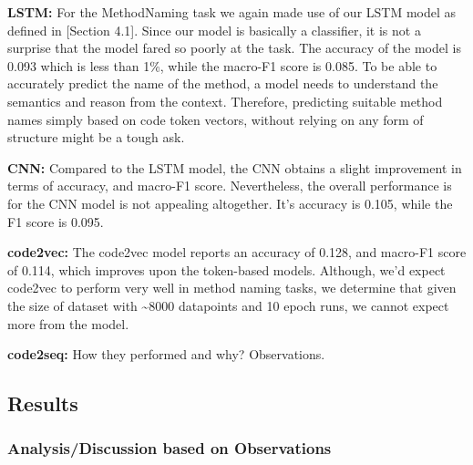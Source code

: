 \documentclass[sigplan,review,anonymous]{acmart}\settopmatter{printfolios=true,printccs=false,printacmref=false}
\begin{document}
\noindent
\textbf{LSTM: } For the MethodNaming task we again made use of our LSTM model as defined in [Section 4.1]. Since our model is basically a classifier, it is not a surprise that the model fared so poorly at the task. The accuracy of the model is 0.093 which is less than 1\%, while the macro-F1 score is 0.085. To be able to accurately predict the name of the method, a model needs to understand the semantics and reason from the context. Therefore, predicting suitable method names simply based on code token vectors, without relying on any form of structure might be a tough ask. \newline


\noindent
\textbf{CNN: } Compared to the LSTM model, the CNN obtains a slight improvement in terms of accuracy, and macro-F1 score. Nevertheless, the overall performance is  for the CNN model is not appealing altogether. It's accuracy is 0.105, while the F1 score is 0.095.  \newline

\noindent
\textbf{code2vec: } The code2vec model reports an accuracy of 0.128, and macro-F1 score of 0.114, which improves upon the token-based models. Although, we'd expect code2vec to perform very well in method naming tasks, we determine that given the size of dataset with \textasciitilde8000 datapoints and 10 epoch runs, we cannot expect more from the model. \newline

\noindent
\textbf{code2seq: } How they performed and why? Observations. 






\subsection{Results}

\subsubsection{Analysis/Discussion based on Observations}
 
\end{document}
